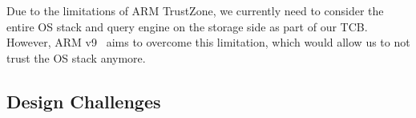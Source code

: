 
Due to the limitations of ARM TrustZone, we currently need to consider the entire OS stack and query engine on the storage side as part of our TCB. However, ARM v9~\cite{arm-realm} aims to overcome this limitation, which would allow us to not trust the OS stack anymore.

\subsection{Design Challenges}
\label{subsect:design-challenges}


